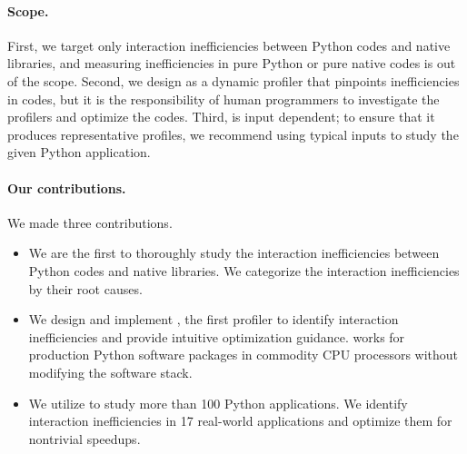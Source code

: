 \paragraph{Scope.}
First, we target only interaction inefficiencies between Python codes and native libraries, and measuring inefficiencies in pure Python or pure native codes is out of the scope. Second, we design \tool{} as a dynamic profiler that pinpoints inefficiencies in codes, but it is the responsibility of human programmers to investigate the profilers and optimize the codes. Third, \tool{} is input dependent; to ensure that it produces representative profiles, we recommend using typical inputs to study the given Python application. 


\paragraph{Our contributions.}
We made three contributions.
\begin{itemize}
\item We are the first to thoroughly study the interaction inefficiencies between Python codes and native libraries. We categorize the interaction inefficiencies by their root causes.

\item We design and implement \tool, the first profiler to identify interaction inefficiencies and provide intuitive optimization guidance. \tool works for production Python software packages in commodity CPU processors without modifying the software stack.

\item We utilize \tool to study more than 100 Python applications. We identify interaction inefficiencies in 17 real-world applications and optimize them for nontrivial speedups.
\end{itemize}

\begin{comment}
    \item We identified redundant \ffs as an important type of inefficiencies in Python applications.
    \item We characterized the Python inefficiencies into six types: loop invariant, input-based identical computation, inappropriate algorithm, slicing, redundant computation and API misuse.
    \item We proposed two novel Python inefficiency patterns: {\tt Mirror-nfc} and {\tt Ghost-nfc}. Our investigation of real-worlds Python applications shows that these two pattern are important indicators of Python diagnosis. 
    \item We design and implement a lightweight Python profiler \tool, to detect inefficiencies without curating the source code nor Python interpreter.
    \item Through our comprehensive evaluation, \tool can pinpoint inefficiency in well-known real-world applications with xx runtime overhead and xx memory, and yields up to xx speedups after eliminating the inefficiencies. 
\end{comment}

